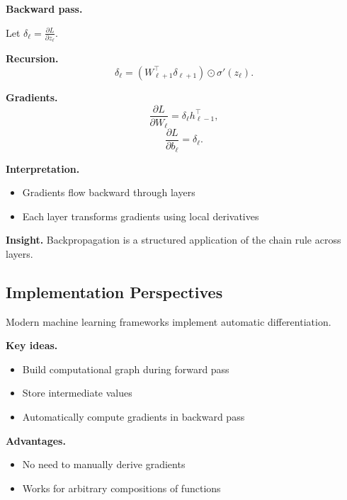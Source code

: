 \noindent
\textbf{Backward pass.}

Let $\delta_\ell = \frac{\partial L}{\partial z_\ell}$.

\medskip

\noindent
\textbf{Recursion.}
\[
\delta_\ell = (W_{\ell+1}^\top \delta_{\ell+1}) \odot \sigma'(z_\ell).
\]

\medskip

\noindent
\textbf{Gradients.}
\[
\frac{\partial L}{\partial W_\ell} = \delta_\ell h_{\ell-1}^\top,
\]
\[
\frac{\partial L}{\partial b_\ell} = \delta_\ell.
\]

\medskip

\noindent
\textbf{Interpretation.}
\begin{itemize}
    \item Gradients flow backward through layers
    \item Each layer transforms gradients using local derivatives
\end{itemize}

\medskip

\noindent
\textbf{Insight.}  
Backpropagation is a structured application of the chain rule across layers.

\subsection{Implementation Perspectives}

Modern machine learning frameworks implement automatic differentiation.

\medskip

\noindent
\textbf{Key ideas.}

\begin{itemize}
    \item Build computational graph during forward pass
    \item Store intermediate values
    \item Automatically compute gradients in backward pass
\end{itemize}

\medskip

\noindent
\textbf{Advantages.}

\begin{itemize}
    \item No need to manually derive gradients
    \item Works for arbitrary compositions of functions
\end{itemize}

